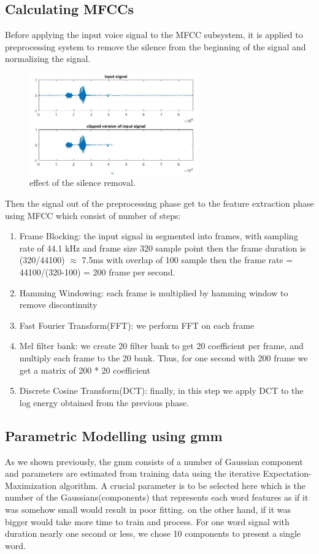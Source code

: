 \documentclass[12pt, a4paper, twoside]{report}
\begin{document}
\subsection{Calculating MFCCs}
Before applying the input voice signal to the MFCC subsystem, it is applied to preprocessing system to remove the silence from the beginning of the signal and normalizing the signal.
\begin{figure}[!h]
	\centering
	\includegraphics[width=0.65\textwidth]
	{images/chapter5/gmm-sremove}
	\caption{effect of the silence removal.}
	\label{fig:gmm-sremove}
\end{figure}

Then the signal out of the preprocessing phase get to the feature extraction phase using MFCC which consist of number of steps:
\begin{enumerate}
\item Frame Blocking: the input signal in segmented into frames, with sampling rate of  44.1 kHz and frame size 320 sample point then the frame duration is (320/44100) $\approx$ 7.5ms with overlap of 100 sample then the frame rate = 44100/(320-100) = 200 frame per second.
\item Hamming Windowing: each frame is multiplied by hamming window to remove discontinuity 
\item Fast Fourier Transform(FFT): we perform FFT on each frame
\item Mel filter bank: we create 20 filter bank to get 20 coefficient per frame, and multiply each frame to the 20 bank. Thus, for one second with 200 frame we get a matrix of  200 * 20 coefficient 
\item Discrete Cosine Transform(DCT): finally, in this step we apply DCT to the log energy obtained from the previous phase.
\end{enumerate}
\subsection{Parametric Modelling using \acrshort{gmm}}
As we shown previously, the \acrshort{gmm} consists of a number of Gaussian component and parameters are estimated from training data using the iterative Expectation-Maximization algorithm. A crucial parameter is to be selected here which is the number of the Gaussians(components) that represents each word features as if it was somehow small would result in poor fitting. on the other hand, if it was bigger would take more time to train and process. For one word signal with duration nearly one second or less, we chose 10 components to present a single word.
\end{document}
